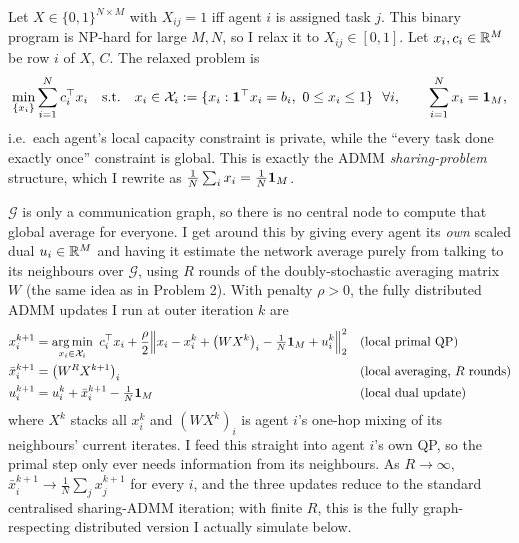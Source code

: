 \documentclass[a4paper, 11pt]{article}
\begin{document}
\begin{solution}
Let $X\in\{0,1\}^{N\times M}$ with $X_{ij}=1$ iff agent $i$ is assigned task $j$. This binary program is NP-hard for large $M,N$, so I relax it to $X_{ij}\in[0,1]$. Let $x_i,c_i\in\mathbb{R}^M$ be row $i$ of $X$, $C$. The relaxed problem is
\begin{align*}
    \min_{\{x_i\}}\sum_{i=1}^N c_i^\top x_i \quad \text{s.t.}\quad x_i\in\mathcal{X}_i:=\{x_i:\ones^\top x_i=b_i,\ 0\le x_i\le 1\}\ \ \forall i, \qquad \sum_{i=1}^N x_i=\ones_M,
\end{align*}
i.e.\ each agent's local capacity constraint is private, while the ``every task done exactly once'' constraint is global. This is exactly the ADMM \emph{sharing-problem} structure, which I rewrite as $\frac1N\sum_ix_i=\frac1N\mathbf{1}_M$.

$\mathcal{G}$ is only a communication graph, so there is no central node to compute that global average for everyone. I get around this by giving every agent its \emph{own} scaled dual $u_i\in\mathbb{R}^M$ and having it estimate the network average purely from talking to its neighbours over $\mathcal{G}$, using $R$ rounds of the doubly-stochastic averaging matrix $W$ (the same idea as in Problem 2). With penalty $\rho>0$, the fully distributed ADMM updates I run at outer iteration $k$ are
\begin{align}
    x_i^{k+1} &= \operatorname*{arg\,min}_{x_i\in\mathcal{X}_i}\ c_i^\top x_i+\frac{\rho}{2}\Big\|x_i-x_i^k+\big(WX^k\big)_i-\tfrac1N\mathbf{1}_M+u_i^k\Big\|_2^2 && \text{(local primal QP)} \\
    \bar x_i^{k+1} &= \big(W^RX^{k+1}\big)_i && \text{(local averaging, $R$ rounds)} \\
    u_i^{k+1} &= u_i^k+\bar x_i^{k+1}-\tfrac1N\mathbf{1}_M && \text{(local dual update)}
\end{align}
where $X^k$ stacks all $x_i^k$ and $(WX^k)_i$ is agent $i$'s one-hop mixing of its neighbours' current iterates. I feed this straight into agent $i$'s own QP, so the primal step only ever needs information from its neighbours. As $R\to\infty$, $\bar x_i^{k+1}\to\frac1N\sum_jx_j^{k+1}$ for every $i$, and the three updates reduce to the standard centralised sharing-ADMM iteration; with finite $R$, this is the fully graph-respecting distributed version I actually simulate below.


\end{solution}
\end{document}
